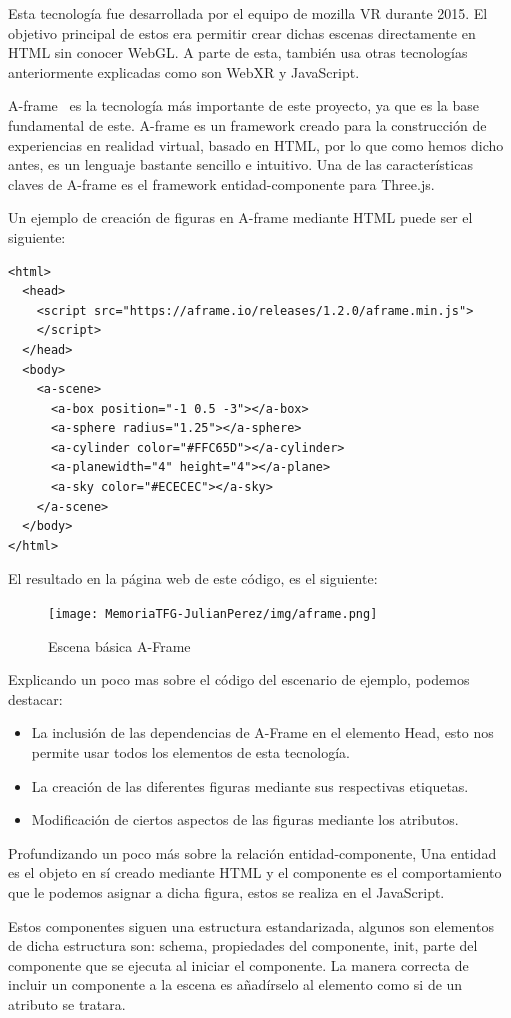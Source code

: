 \documentclass[a4paper, 12pt]{book}
\begin{document}
Esta tecnología fue desarrollada por el equipo de mozilla VR durante 2015. El objetivo principal de estos era permitir crear dichas escenas directamente en HTML sin conocer WebGL. A parte de esta, también usa otras tecnologías anteriormente explicadas como son WebXR y JavaScript.

A-frame~\cite{a} es la tecnología más importante de este proyecto, ya que es la base fundamental de este. A-frame es un framework creado para la construcción de experiencias en realidad virtual, basado en HTML, por lo que como hemos dicho antes, es un lenguaje bastante sencillo e intuitivo. Una de las características claves de A-frame es el framework entidad-componente para Three.js.

Un ejemplo de creación de figuras en A-frame mediante HTML puede ser el siguiente:
\begin{verbatim}
<html>
  <head>
    <script src="https://aframe.io/releases/1.2.0/aframe.min.js">
    </script>
  </head>
  <body>
    <a-scene>
      <a-box position="-1 0.5 -3"></a-box>
      <a-sphere radius="1.25"></a-sphere>
      <a-cylinder color="#FFC65D"></a-cylinder>
      <a-planewidth="4" height="4"></a-plane>
      <a-sky color="#ECECEC"></a-sky>
    </a-scene>
  </body>
</html>
\end{verbatim}
El resultado en la página web de este código, es el siguiente:
\begin{figure}[H]
  \centering
  \texttt{[image: MemoriaTFG-JulianPerez/img/aframe.png]}
  \caption{Escena básica A-Frame}\label{aframe}
\end{figure}
Explicando un poco mas sobre el código del escenario de ejemplo, podemos destacar: 
\begin{itemize}
    \item La inclusión de las dependencias de A-Frame en el elemento Head, esto nos permite usar todos los elementos de esta tecnología.
    \item La creación de las diferentes figuras mediante sus respectivas etiquetas.
    \item Modificación de ciertos aspectos de las figuras mediante los atributos.
\end{itemize}
Profundizando un poco más sobre la relación entidad-componente, Una entidad es el objeto en sí creado mediante HTML y el componente es el comportamiento que le podemos asignar a dicha figura, estos se realiza en el JavaScript. 

Estos componentes siguen una estructura estandarizada, algunos son elementos de dicha estructura son: schema, propiedades del componente, init, parte del componente que se ejecuta al iniciar el componente. La manera correcta de incluir un componente a la escena es añadírselo al elemento como si de un atributo se tratara.
\end{document}
